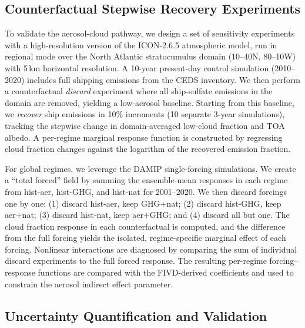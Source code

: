 \documentclass{article}
\begin{document}
\subsection{Counterfactual Stepwise Recovery Experiments}

To validate the aerosol-cloud pathway, we design a set of sensitivity experiments with a high-resolution version of the ICON-2.6.5 atmospheric model, run in regional mode over the North Atlantic stratocumulus domain (10--40\degree N, 80--10\degree W) with 5\,km horizontal resolution. A 10-year present-day control simulation (2010--2020) includes full shipping emissions from the CEDS inventory. We then perform a counterfactual \textit{discard} experiment where all ship-sulfate emissions in the domain are removed, yielding a low-aerosol baseline. Starting from this baseline, we \textit{recover} ship emissions in 10\% increments (10 separate 3-year simulations), tracking the stepwise change in domain-averaged low-cloud fraction and TOA albedo. A per-regime marginal response function is constructed by regressing cloud fraction changes against the logarithm of the recovered emission fraction.

For global regimes, we leverage the DAMIP single-forcing simulations. We create a ``total forced'' field by summing the ensemble-mean responses in each regime from hist-aer, hist-GHG, and hist-nat for 2001--2020. We then discard forcings one by one: (1) discard hist-aer, keep GHG+nat; (2) discard hist-GHG, keep aer+nat; (3) discard hist-nat, keep aer+GHG; and (4) discard all but one. The cloud fraction response in each counterfactual is computed, and the difference from the full forcing yields the isolated, regime-specific marginal effect of each forcing. Nonlinear interactions are diagnosed by comparing the sum of individual discard experiments to the full forced response. The resulting per-regime forcing–response functions are compared with the FIVD-derived coefficients and used to constrain the aerosol indirect effect parameter.

\subsection{Uncertainty Quantification and Validation}
\end{document}
